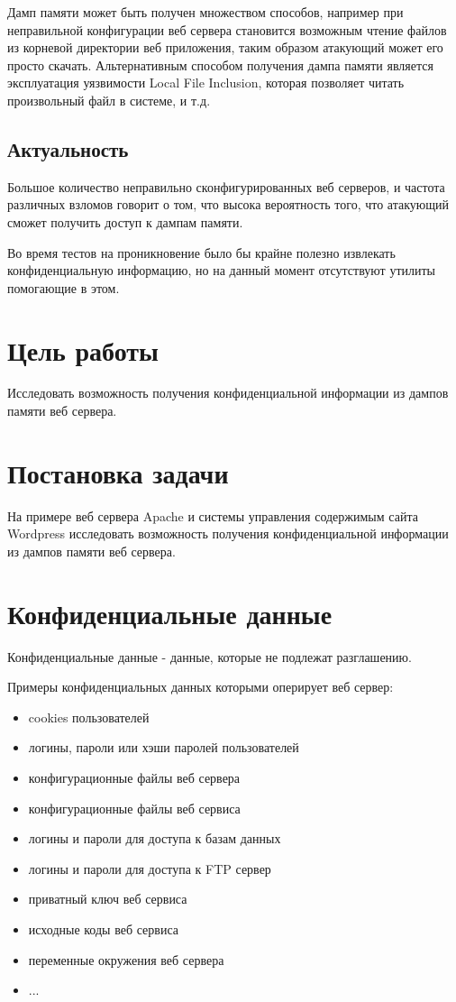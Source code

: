 \documentclass[20pt]{article}
\begin{document}
Дамп памяти может быть получен множеством способов, например при неправильной
конфигурации веб сервера становится возможным чтение файлов из корневой
директории веб приложения, таким образом атакующий может его просто скачать.
Альтернативным способом получения дампа памяти является эксплуатация уязвимости
Local File Inclusion, которая позволяет читать произвольный файл в системе, и т.д.

\subsection{Актуальность}
Большое количество неправильно сконфигурированных веб серверов, и частота различных
взломов говорит о том, что высока вероятность того, что атакующий сможет получить
доступ к дампам памяти.

Во время тестов на проникновение было бы крайне полезно извлекать конфиденциальную
информацию, но на данный момент отсутствуют утилиты помогающие в этом.

\newpage

\section{Цель работы}
Исследовать возможность получения конфиденциальной информации из дампов памяти веб сервера.

\newpage

\section{Постановка задачи}
На примере веб сервера Apache и системы управления содержимым сайта Wordpress
исследовать возможность получения конфиденциальной информации из дампов памяти
веб сервера.

\newpage

\section{Конфиденциальные данные}
Конфиденциальные данные - данные, которые не подлежат разглашению.

Примеры конфиденциальных данных которыми оперирует веб сервер:

\begin{itemize}
  \item cookies пользователей
  \item логины, пароли или хэши паролей пользователей
  \item конфигурационные файлы веб сервера
  \item конфигурационные файлы веб сервиса
  \item логины и пароли для доступа к базам данных
  \item логины и пароли для доступа к FTP сервер
  \item приватный ключ веб сервиса
  \item исходные коды веб сервиса
  \item переменные окружения веб сервера
  \item ...
\end{itemize}
\end{document}
